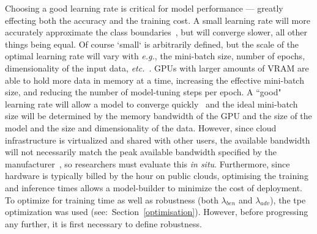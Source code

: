 \documentclass[sn-mathphys-num]{sn-jnl}%
\begin{document}
Choosing a good learning rate is critical for model performance --- greatly effecting both the accuracy and the training cost. A small learning rate will more accurately approximate the class boundaries~\cite{cao2019generalization}, but will converge slower, all other things being equal. Of course `small` is arbitrarily defined, but the scale of the optimal learning rate will vary with \textit{e.g.}, the mini-batch size, number of epochs, dimensionality of the input data, \textit{etc.}~\cite{granziol2022learning}. GPUs with larger amounts of VRAM are able to hold more data in memory at a time, increasing the effective mini-batch size, and reducing the number of model-tuning steps per epoch. A ``good" learning rate will allow a model to converge quickly~\cite{smith2019super,granziol2022learning} and the ideal mini-batch size will be determined by the memory bandwidth of the GPU and the size of the model and the size and dimensionality of the data. However, since cloud infrastructure is virtualized and shared with other users, the available bandwidth will not necessarily match the peak available bandwidth specified by the manufacturer~\cite{sajid2013cloud}, so researchers must evaluate this \textit{in situ}. Furthermore, since hardware is typically billed by the hour on public clouds, optimising the training and inference times allows a model-builder to minimize the cost of deployment. To optimize for training time as well as robustness (both $\lambda_{ben}$ and $\lambda_{adv}$), the \acrshort{tpe} optimization was used (see:~Section~\ref{optimisation}). However, before progressing any further, it is first necessary to define robustness.
\end{document}
